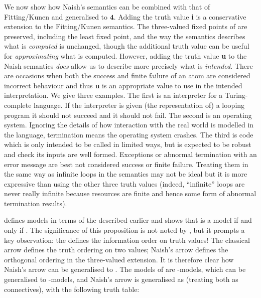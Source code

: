 \documentclass{tlp}
\newcommand{\Quad}{\ensuremath{\mathbf{4}}}
\begin{document}
We now show how Naish's semantics can be combined with that of
Fitting/Kunen and generalised to \Quad.
Adding the truth value \textbf{i} is a conservative extension to the
Fitting/Kunen semantics.  The three-valued fixed points of  are
preserved, including the least fixed point, and the
way the semantics describes what is \emph{computed} is unchanged,
though the additional truth value can be useful for \emph{approximating}
what is computed.
However, adding the truth value \textbf{u} to the Naish semantics
\emph{does} allow us to describe more precisely  what is \emph{intended}.
There are occasions when both the success and finite failure of an atom
are considered incorrect behaviour and thus \textbf{u} is an appropriate
value to use in the intended interpretation.  We give three examples.
The first is an interpreter for a Turing-complete language.  If the
interpreter is given (the representation of) a looping program it should
not succeed and it should not fail.  The second is an operating system.
Ignoring the details of how interaction with the real world is modelled
in the language, termination means the operating system crashes.
The third is code which is only intended to be called in limited ways,
but is expected to be robust and check its inputs are well formed.
Exceptions or abnormal termination with an error message are best not
considered success or finite failure.  Treating them in the same way as
infinite loops in the semantics may not be ideal but it is more expressive
than using the other three truth values (indeed, ``infinite'' loops are
never really infinite because resources are finite and hence some form
of abnormal termination results).

defines models in terms of the  described earlier and shows
that  is a model if and only if 
.
The significance of this proposition is not noted by ,
but it prompts a key observation: the 
defines the information order on truth values!  The classical arrow
defines the truth ordering on two values; Naish's arrow defines the
orthogonal ordering in the three-valued extension.  It is therefore
clear how Naish's arrow can be generalised to .
The models of
 are -models, which can be
generalised to -models, and Naish's arrow
is generalised as  (treating both as connectives),
with the following truth table:
\end{document}
